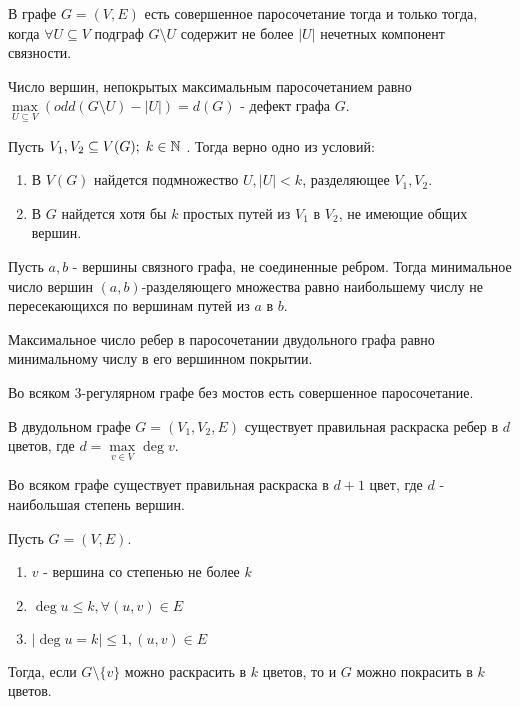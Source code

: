 \documentclass[12pt]{article}
\begin{document}
\begin{thm}[Татта, 1947]
    В графе $G = (V, E)$ есть совершенное паросочетание тогда и только тогда, когда $\forall U \subseteq V$ подграф $G \setminus U$ содержит не более $|U|$ нечетных компонент связности.
\end{thm}
\begin{thm}
    Число вершин, непокрытых максимальным паросочетанием равно $\max\limits_{U \subseteq V} ( odd(G \setminus U) - |U|) = d(G)$ - дефект графа $G$.
\end{thm}
\begin{thm}[Гернинг, 2000]
    Пусть $V_1, V_2 \subseteq V(G); \; k \in  \mathbb{N}$ . Тогда верно одно из условий: 
    \begin{enumerate}
	\item В $V(G)$ найдется подмножество $U, |U| < k$, разделяющее $V_1, V_2$.
	\item В $G$ найдется хотя бы $k$ простых путей из $V_1$ в $V_2$, не имеющие общих вершин.
    \end{enumerate}
\end{thm}
\begin{thm}[Менгер, 1927]
    Пусть $a, b$ - вершины связного графа, не соединенные ребром. Тогда минимальное число вершин $(a, b)$-разделяющего множества равно наибольшему числу не пересекающихся по вершинам путей из $a$ в $b$.
\end{thm}
\begin{thm}[Кёнинг, 1931]
    Максимальное число ребер в паросочетании двудольного графа равно минимальному числу в его вершинном покрытии.
\end{thm}
\begin{thm}[Петерсон, 1891]
    Во всяком 3-регулярном графе без мостов есть совершенное паросочетание.
\end{thm}
\begin{thm}
    В двудольном графе $G = (V_1, V_2, E)$ существует правильная раскраска ребер в $d$ цветов, где $d = \max\limits_{v \in V} \deg v$.
\end{thm}
\begin{thm}[Визинг, 1964]
    Во всяком графе существует правильная раскраска в $d + 1$ цвет, где $d$ - наибольшая степень вершин.
\end{thm}
\begin{lm}
    Пусть $G=(V, E)$.
    $ $
    \begin{enumerate}
        \item $v$ - вершина со степенью не более $k$ 
	\item $\deg u \le k, \forall (u, v) \in  E$
	\item $|\deg u = k| \le 1, (u, v) \in E$
    \end{enumerate}
    Тогда, если $G \setminus \{v\}$ можно раскрасить в $k$ цветов, то и $G$ можно покрасить в $k$ цветов.
\end{lm}
\end{document}
